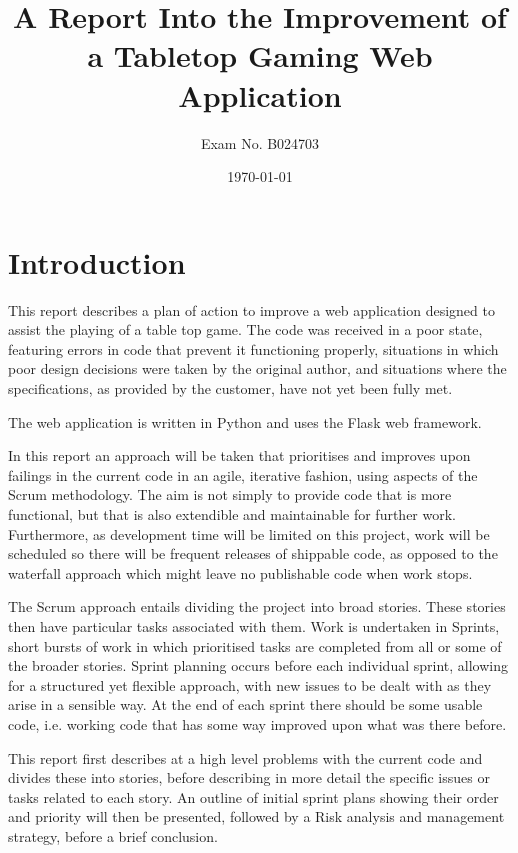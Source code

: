 \documentclass[a4paper,12pt]{article}
\begin{document}
\title{A Report Into the Improvement of a Tabletop Gaming Web Application}
\author{Exam No. B024703}
\date{\today}
\maketitle

\section{Introduction}
This report describes a plan of action to improve a web application designed to assist the playing of a table top game. The code was received in a poor state, featuring errors in code that prevent it functioning properly, situations in which poor design decisions were taken by the original author, and situations where the specifications, as provided by the customer, have not yet been fully met.

The web application is written in Python and uses the Flask web framework. 

In this report an approach will be taken that prioritises and improves upon failings in the current code in an agile, iterative fashion, using aspects of the Scrum methodology. The aim is not simply to provide code that is more functional, but that is also extendible and maintainable for further work. Furthermore, as development time will be limited on this project, work will be scheduled so there will be frequent releases of shippable code, as opposed to the waterfall approach which might leave no publishable code when work stops.

The Scrum approach entails dividing the project into broad stories. These stories then have particular tasks associated with them. Work is undertaken in Sprints, short bursts of work in which prioritised tasks are completed from all or some of the broader stories. Sprint planning occurs before each individual sprint, allowing for a structured yet flexible approach, with new issues to be dealt with as they arise in a sensible way. At the end of each sprint there should be some usable code, i.e. working code that has some way improved upon what was there before.

This report first describes at a high level problems with the current code and divides these into stories, before describing in more detail the specific issues or tasks related to each story. An outline of initial sprint plans showing their order and priority will then be presented, followed by a Risk analysis and management strategy, before a brief conclusion.
\end{document}
